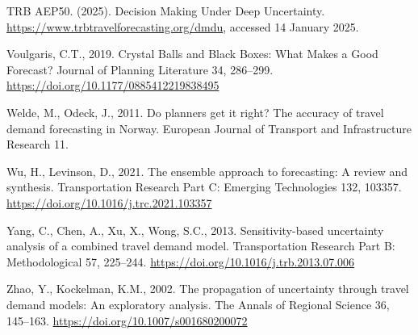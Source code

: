 \documentclass[
  futuretransp,
  submit,
  moreauthors,
]{Definitions/mdpi}
\newlength{\cslhangindent}
\newenvironment{CSLReferences}[2] %
 {\begin{list}{}{%
  \setlength{\itemindent}{0pt}
  \setlength{\leftmargin}{0pt}
  \setlength{\parsep}{0pt}
  \ifodd #1
   \setlength{\leftmargin}{\cslhangindent}
   \setlength{\itemindent}{-1\cslhangindent}
  \fi
  \setlength{\itemsep}{#2\baselineskip}}}
 {\end{list}}
\begin{document}
\begin{CSLReferences}{1}{0}
TRB AEP50. (2025). Decision Making Under Deep Uncertainty.
\url{https://www.trbtravelforecasting.org/dmdu}, accessed 14 January 2025.


 Voulgaris, C.T., 2019. Crystal
{Balls} and {Black Boxes}: {What Makes} a {Good Forecast}? Journal of Planning
Literature 34, 286--299.  \url{https://doi.org/10.1177/0885412219838495}

 Welde, M., Odeck, J., 2011. Do
planners get it right? {The} accuracy of travel demand forecasting in {Norway}.
European Journal of Transport and Infrastructure Research 11.

 Wu, H., Levinson, D., 2021. The ensemble
approach to forecasting: {A} review and synthesis. Transportation Research Part
C: Emerging Technologies 132, 103357.
\url{https://doi.org/10.1016/j.trc.2021.103357}

 Yang, C., Chen, A., Xu, X., Wong, S.C.,
2013. Sensitivity-based uncertainty analysis of a combined travel demand model.
Transportation Research Part B: Methodological 57, 225--244.
\url{https://doi.org/10.1016/j.trb.2013.07.006}

 Zhao, Y., Kockelman, K.M., 2002. The
propagation of uncertainty through travel demand models: {An} exploratory
analysis. The Annals of Regional Science 36, 145--163.
\url{https://doi.org/10.1007/s001680200072}

\end{CSLReferences}










\PublishersNote{} 
\end{document}
